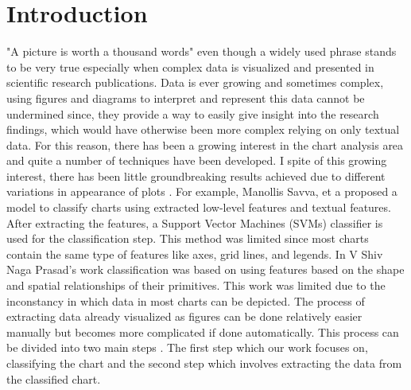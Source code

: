 \documentclass[12pt, a4paper,oneside]{report}
\begin{document}

\setcounter{tocdepth}{10}

\clearpage
\tableofcontents





\listoffigures
\listoftables

\titleformat{\chapter}{\LARGE\bfseries}{\thechapter}{1em}{}

\newpage
\chapter{Introduction}
"A picture is worth a thousand words" even though a widely used phrase stands to be very true especially when complex data is visualized and presented in scientific research publications. 
Data is ever growing and sometimes complex, using figures and diagrams to interpret and represent this data cannot be undermined since, they provide a way to easily give insight into the research findings, which would have otherwise been more complex relying on  only textual data. For this reason, there has been a growing interest in the chart analysis area and quite a number of techniques have been developed. I spite of this growing interest, there has been little groundbreaking results achieved due to different variations in appearance of plots \cite{liu2015chart}.
For example, Manollis Savva, et a \cite{savva2011revision} proposed a model to classify charts using extracted low-level features and textual features. After extracting the features, a  Support Vector Machines (SVMs) classifier is used for the classification step. This method was limited since most charts contain the same type of features like axes, grid lines, and legends.
In V Shiv Naga Prasad's work \cite{prasad2007classifying} classification was based on using features based on the shape and spatial relationships of their primitives. This work was limited due to the inconstancy in which data in most charts can be depicted.
The process of extracting data already visualized as figures can be done relatively easier manually but becomes more complicated if done automatically. This process can be divided into two main steps \cite{savva2011revision}. The first step which our work focuses on, classifying the chart and the second step which involves extracting the data from the classified chart.
\end{document}

